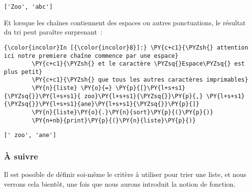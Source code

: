     \begin{Verbatim}[commandchars=\\\{\}]
['Zoo', 'abc']

    \end{Verbatim}

    Et lorsque les chaînes contiennent des espaces ou autres ponctuations,
le résultat du tri peut paraître surprenant~:

    \begin{Verbatim}[commandchars=\\\{\}]
{\color{incolor}In [{\color{incolor}8}]:} \PY{c+c1}{\PYZsh{} attention ici notre premiere chaîne commence par une espace}
        \PY{c+c1}{\PYZsh{} et le caractère \PYZsq{}Espace\PYZsq{} est plus petit}
        \PY{c+c1}{\PYZsh{} que tous les autres caractères imprimables}
        \PY{n}{liste} \PY{o}{=} \PY{p}{[}\PY{l+s+s1}{\PYZsq{}}\PY{l+s+s1}{ zoo}\PY{l+s+s1}{\PYZsq{}}\PY{p}{,} \PY{l+s+s1}{\PYZsq{}}\PY{l+s+s1}{ane}\PY{l+s+s1}{\PYZsq{}}\PY{p}{]}
        \PY{n}{liste}\PY{o}{.}\PY{n}{sort}\PY{p}{(}\PY{p}{)}
        \PY{n+nb}{print}\PY{p}{(}\PY{n}{liste}\PY{p}{)}
\end{Verbatim}


    \begin{Verbatim}[commandchars=\\\{\}]
[' zoo', 'ane']

    \end{Verbatim}

    \hypertarget{uxe0-suivre}{%
\subsubsection{À suivre}\label{uxe0-suivre}}

    Il est possible de définir soi-même le critère à utiliser pour trier une
liste, et nous verrons cela bientôt, une fois que nous aurons introduit
la notion de fonction.


    
    
    
